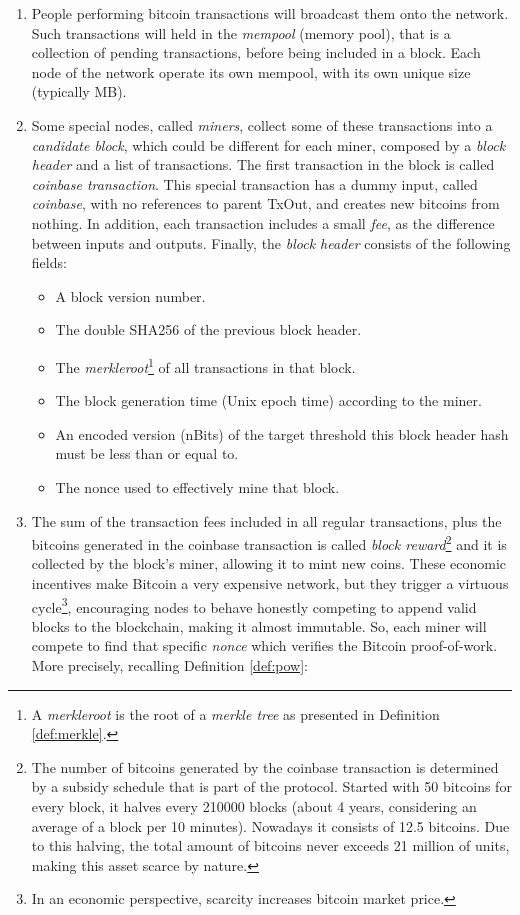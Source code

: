 \begin{enumerate}
    \item People performing bitcoin transactions will broadcast them onto the network. Such transactions will held in the \textit{mempool} (memory pool), that is a collection of pending transactions, before being included in a block. Each node of the network operate its own mempool, with its own unique size (typically MB).
    \item Some special nodes, called \textit{miners}, collect some of these transactions into a \textit{candidate block}, which could be different for each miner, composed by a \textit{block header} and a list of transactions. The first transaction in the block is called \textit{coinbase transaction}. This special transaction has a dummy input, called \textit{coinbase}, with no references to parent TxOut, and creates new bitcoins from nothing. In addition, each transaction includes a small \textit{fee}, as the difference between inputs and outputs. Finally, the \textit{block header} consists of the following fields:
    \begin{itemize}
        \item A block version number.
        \item The double SHA256 of the previous block header.
        \item The \textit{merkleroot}\textup{\footnote{A \textit{merkleroot} is the root of a \textit{merkle tree} as presented in Definition \ref{def:merkle}.}} of all transactions in that block.
        \item The block generation time (Unix epoch time) according to the miner.
        \item An encoded version (nBits) of the target threshold this block header hash must be less than or equal to.
        \item The nonce used to effectively mine that block.
    \end{itemize}
    \item The sum of the transaction fees included in all regular transactions, plus the bitcoins generated in the coinbase transaction is called \textit{block reward}\textup{\footnote{The number of bitcoins generated by the coinbase transaction is determined by a subsidy schedule that is part of the protocol. Started with 50 bitcoins for every block, it halves every 210000 blocks (about 4 years, considering an average of a block per 10 minutes). Nowadays it consists of 12.5 bitcoins. Due to this halving, the total amount of bitcoins never exceeds 21 million of units, making this asset scarce by nature.}} and it is collected by the block's miner, allowing it to mint new coins. These economic incentives make Bitcoin a very expensive network, but they trigger a virtuous cycle\footnote{In an economic perspective, scarcity increases bitcoin market price.}, encouraging nodes to behave honestly competing to append valid blocks to the blockchain, making it almost immutable. So, each miner will compete to find that specific \textit{nonce} which verifies the Bitcoin proof-of-work. More precisely, recalling Definition \ref{def:pow}:
    

\end{enumerate}
